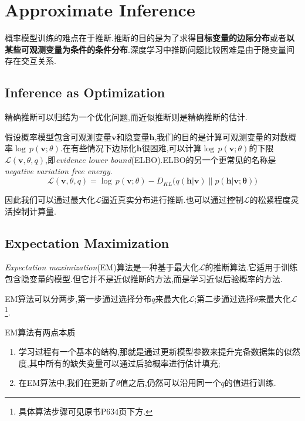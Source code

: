 \chapter{Approximate Inference}

概率模型训练的难点在于推断.推断的目的是为了求得\textbf{目标变量的边际分布}或者\textbf{以某些可观测变量为条件的条件分布}.深度学习中推断问题比较困难是由于隐变量间存在交互关系.

\section{Inference as Optimization}

精确推断可以归结为一个优化问题,而近似推断则是精确推断的估计.

假设概率模型包含可观测变量$\mathbf v$和隐变量$\mathbf h$,我们的目的是计算可观测变量的对数概率$\log\,p(\mathbf v;\theta)$.在有些情况下边际化$\mathbf h$很困难,可以计算$\log\,p(\mathbf v;\theta)$的下限$\mathcal L(\mathbf v,\theta,q)$,即\textit{evidence lower bound}(ELBO).ELBO的另一个更常见的名称是\textit{negative variation free energy}.
\begin{equation}
\mathcal L(\mathbf v,\theta,q)=\log\,p(\mathbf v;\theta)-D_{KL}\Big(q(\mathbf{h|v})\big\|p(\mathbf{h|v;\theta})\Big)
\end{equation}

因此我们可以通过最大化$\mathcal L$逼近真实分布进行推断.也可以通过控制$\mathcal L$的松紧程度灵活控制计算量.

\section{Expectation Maximization}

\textit{Expectation maximization}(EM)算法是一种基于最大化$\mathcal L$的推断算法.它适用于训练包含隐变量的模型.但它并不是近似推断的方法,而是学习近似后验概率的方法.

EM算法可以分两步,第一步通过选择分布$q$来最大化$\mathcal L$;第二步通过选择$\theta$来最大化$\mathcal L$\footnote{具体算法步骤可见原书P$634$页下方.}.

EM算法有两点本质
\begin{enumerate}
    \item 学习过程有一个基本的结构,那就是通过更新模型参数来提升完备数据集的似然度,其中所有的缺失变量可以通过后验概率进行估计填充;
    \item 在EM算法中,我们在更新了$\theta$值之后,仍然可以沿用同一个$q$的值进行训练.
\end{enumerate}